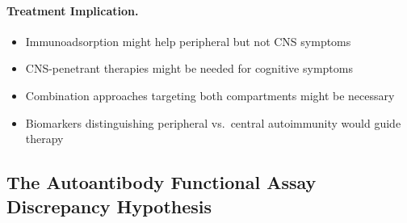 \paragraph{Treatment Implication.}
\begin{itemize}
    \item Immunoadsorption might help peripheral but not CNS symptoms
    \item CNS-penetrant therapies might be needed for cognitive symptoms
    \item Combination approaches targeting both compartments might be necessary
    \item Biomarkers distinguishing peripheral vs.\ central autoimmunity would guide therapy
\end{itemize}

\subsection{The Autoantibody Functional Assay Discrepancy Hypothesis}

